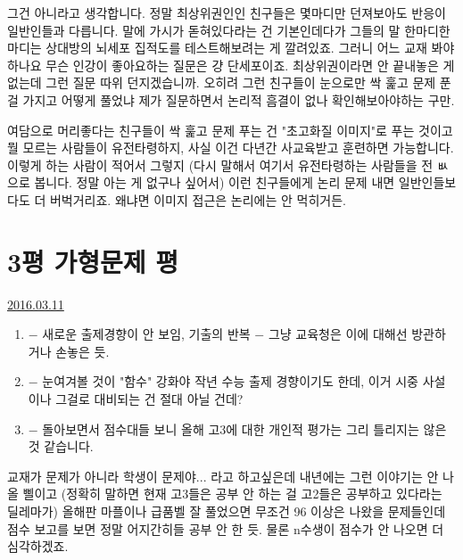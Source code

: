 그건 아니라고 생각합니다.
정말 최상위권인인 친구들은 몇마디만 던져보아도 반응이 일반인들과 다릅니다.
말에 가시가 돋혀있다라는 건 기본인데다가 그들의 말 한마디한마디는 상대방의 뇌세포 집적도를 테스트해보려는 게 깔려있죠.
그러니 어느 교재 봐야하나요 무슨 인강이 좋아요하는 질문은 걍 단세포이죠.
최상위권이라면 안 끝내놓은 게 없는데 그런 질문 따위 던지겠습니까.
오히려 그런 친구들이 눈으로만 싹 훑고 문제 푼 걸 가지고 어떻게 풀었냐 제가 질문하면서 논리적 흠결이 없나 확인해보아야하는 구만.
\vspace{5mm}

여담으로 머리좋다는 친구들이 싹 훑고 문제 푸는 건 "초고화질 이미지"로 푸는 것이고
뭘 모르는 사람들이 유전타령하지, 사실 이건 다년간 사교육받고 훈련하면 가능합니다. 이렇게 하는 사람이 적어서 그렇지
(다시 말해서 여기서 유전타령하는 사람들을 전 ㅄ으로 봅니다. 정말 아는 게 없구나 싶어서)
이런 친구들에게 논리 문제 내면 일반인들보다도 더 버벅거리죠. 왜냐면 이미지 접근은 논리에는 안 먹히거든.
\vspace{5mm}






\section{3평 가형문제 평}
\href{https://www.kockoc.com/Apoc/673299}{2016.03.11}

\vspace{5mm}

\begin{enumerate}
    \item $-$ 새로운 출제경향이 안 보임, 기출의 반복 $-$ 그냥 교육청은 이에 대해선 방관하거나 손놓은 듯.
    \item $-$ 눈여겨볼 것이 "함수" 강화야 작년 수능 출제 경향이기도 한데, 이거 시중 사설이나 그걸로 대비되는 건 절대 아닐 건데?
    \item $-$ 돌아보면서 점수대들 보니 올해 고3에 대한 개인적 평가는 그리 틀리지는 않은 것 같습니다.
\end{enumerate}
\vspace{5mm}

교재가 문제가 아니라 학생이 문제야... 라고 하고싶은데 내년에는 그런 이야기는 안 나올 삘이고
(정확히 말하면 현재 고3들은 공부 안 하는 걸 고2들은 공부하고 있다라는 딜레마가)
올해판 마플이나 급품벨 잘 풀었으면 무조건 96 이상은 나왔을 문제들인데 점수 보고를 보면 정말 어지간히들 공부 안 한 듯.
물론 n수생이 점수가 안 나오면 더 심각하겠죠.
\vspace{5mm}

